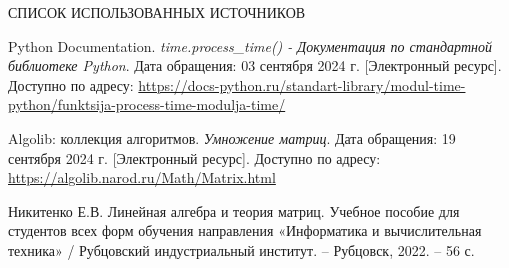 \begin{center}
    \MakeUppercase{\large Список использованных источников}
\end{center}

\renewcommand{\refname}{}
\vspace{-11mm}

\begin{thebibliography}{9}
     Python Documentation. \textit{time.process\_time() - Документация по стандартной библиотеке Python}. Дата обращения: 03 сентября 2024 г. [Электронный ресурс]. Доступно по адресу: \url{https://docs-python.ru/standart-library/modul-time-python/funktsija-process-time-modulja-time/}
    
     Algolib: коллекция алгоритмов. \textit{Умножение матриц}. Дата обращения: 19 сентября 2024 г. [Электронный ресурс]. Доступно по адресу: \url{https://algolib.narod.ru/Math/Matrix.html}
    
     Никитенко Е.В. Линейная алгебра и теория матриц. Учебное пособие для студентов всех форм обучения направления «Информатика и вычислительная техника» / Рубцовский индустриальный институт. – Рубцовск, 2022. – 56 с.
  
\end{thebibliography}